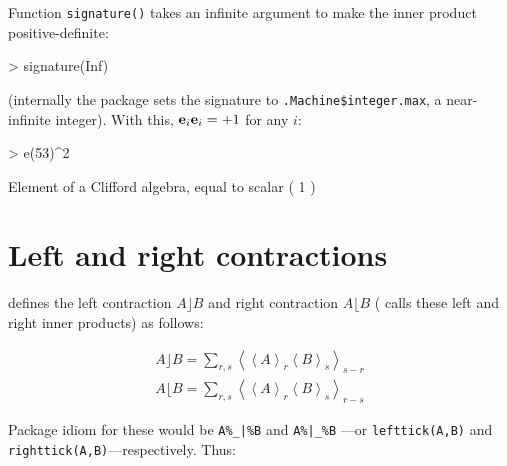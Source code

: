 \documentclass{birkjour}
\theoremstyle{definition}
\theoremstyle{remark}
\numberwithin{equation}{section}
\begin{document}
Function {\tt signature()} takes an infinite argument to make the
inner product positive-definite:

\begin{Schunk}
\begin{Sinput}
> signature(Inf)
\end{Sinput}
\end{Schunk}

(internally the package sets the signature to
{\tt .Machine\$integer.max}, a near-infinite integer).  With this,
${\bf e}_{i}{\bf e}_{i}=+1$ for any $i$:

\begin{Schunk}
\begin{Sinput}
> e(53)^2
\end{Sinput}
\begin{Soutput}
Element of a Clifford algebra, equal to
scalar ( 1 )
\end{Soutput}
\end{Schunk}


\section{Left and right contractions}

\cite{dorst2002} defines the left contraction $A\rfloor B$ and right
contraction $A\lfloor B$ (\cite{chisholm2012} calls these left and
right inner products) as follows:

\begin{eqnarray}
\displaystyle A\rfloor B = \sum_{r,s}\left\langle\left\langle
A\right\rangle_r\left\langle B\right\rangle_s\right\rangle_{s-r}\\
\displaystyle A\lfloor B = \sum_{r,s}\left\langle\left\langle
A\right\rangle_r\left\langle B\right\rangle_s\right\rangle_{r-s}
\end{eqnarray}


Package idiom for these would be {\tt A\%\_|\%B} and {\tt A\%|\_\%B}
---or {\tt lefttick(A,B)} and {\tt righttick(A,B)}---respectively.
Thus:
\end{document}
